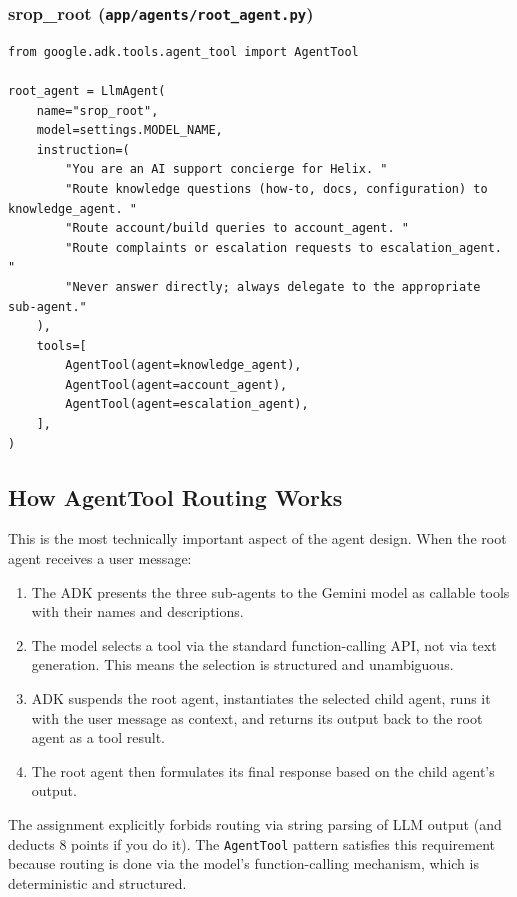\documentclass[12pt,a4paper]{article}
\begin{document}
\subsubsection{srop\_root (\texttt{app/agents/root\_agent.py})}

\begin{lstlisting}[style=python]
from google.adk.tools.agent_tool import AgentTool

root_agent = LlmAgent(
    name="srop_root",
    model=settings.MODEL_NAME,
    instruction=(
        "You are an AI support concierge for Helix. "
        "Route knowledge questions (how-to, docs, configuration) to knowledge_agent. "
        "Route account/build queries to account_agent. "
        "Route complaints or escalation requests to escalation_agent. "
        "Never answer directly; always delegate to the appropriate sub-agent."
    ),
    tools=[
        AgentTool(agent=knowledge_agent),
        AgentTool(agent=account_agent),
        AgentTool(agent=escalation_agent),
    ],
)
\end{lstlisting}

\subsection{How AgentTool Routing Works}

This is the most technically important aspect of the agent design. When the root agent receives a user message:

\begin{enumerate}[leftmargin=1.5em]
  \item The ADK presents the three sub-agents to the Gemini model as callable tools with their names and descriptions.
  \item The model selects a tool via the standard function-calling API, not via text generation. This means the selection is structured and unambiguous.
  \item ADK suspends the root agent, instantiates the selected child agent, runs it with the user message as context, and returns its output back to the root agent as a tool result.
  \item The root agent then formulates its final response based on the child agent's output.
\end{enumerate}

The assignment explicitly forbids routing via string parsing of LLM output (and deducts 8 points if you do it). The \texttt{AgentTool} pattern satisfies this requirement because routing is done via the model's function-calling mechanism, which is deterministic and structured.
\end{document}
